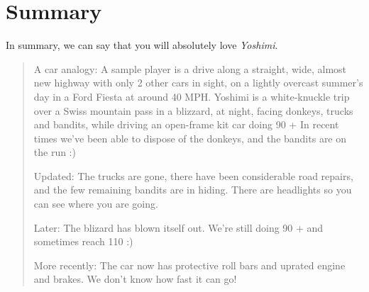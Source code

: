 \documentclass[
 11pt,
 twoside,
 a4paper,
 final                                 %
]{article}
\begin{document}









%
%
% 

\section{Summary}
\label{sec:summary}

   In summary, we can say that you will absolutely love \textsl{Yoshimi}.

   \begin{quotation}
    A car analogy:
      A sample player is a drive along a straight, wide, almost new highway
      with only 2 other cars in sight, on a lightly overcast summer's day in a
      Ford Fiesta at around 40 MPH.
      Yoshimi is a white-knuckle trip over a Swiss mountain pass in a blizzard,
      at night, facing donkeys, trucks and bandits, while driving an open-frame
      kit car doing 90 +
      In recent times we've been able to dispose of the donkeys, and the
      bandits are on the run :)

    Updated:
      The trucks are gone, there have been considerable road repairs, and the few
      remaining bandits are in hiding. There are headlights so you can see where
      you are going.

    Later:
      The blizard has blown itself out. We're still doing 90 + and sometimes reach
      110 :)

    More recently:
      The car now has protective roll bars and uprated engine and brakes. We don't
      know how fast it can go!
   \end{quotation}




\printindex
\end{document}
